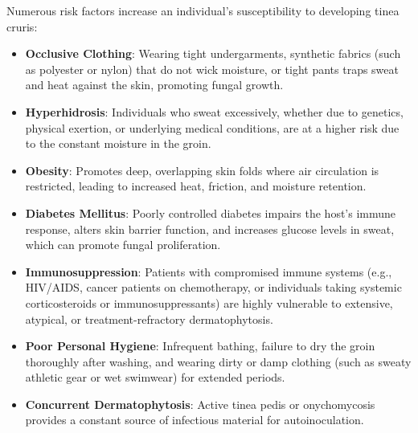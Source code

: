 Numerous risk factors increase an individual's susceptibility to developing tinea cruris:
\begin{itemize}
    \item \textbf{Occlusive Clothing}: Wearing tight undergarments, synthetic fabrics (such as polyester or nylon) that do not wick moisture, or tight pants traps sweat and heat against the skin, promoting fungal growth.
    \item \textbf{Hyperhidrosis}: Individuals who sweat excessively, whether due to genetics, physical exertion, or underlying medical conditions, are at a higher risk due to the constant moisture in the groin.
    \item \textbf{Obesity}: Promotes deep, overlapping skin folds where air circulation is restricted, leading to increased heat, friction, and moisture retention.
    \item \textbf{Diabetes Mellitus}: Poorly controlled diabetes impairs the host's immune response, alters skin barrier function, and increases glucose levels in sweat, which can promote fungal proliferation.
    \item \textbf{Immunosuppression}: Patients with compromised immune systems (e.g., HIV/AIDS, cancer patients on chemotherapy, or individuals taking systemic corticosteroids or immunosuppressants) are highly vulnerable to extensive, atypical, or treatment-refractory dermatophytosis.
    \item \textbf{Poor Personal Hygiene}: Infrequent bathing, failure to dry the groin thoroughly after washing, and wearing dirty or damp clothing (such as sweaty athletic gear or wet swimwear) for extended periods.
    \item \textbf{Concurrent Dermatophytosis}: Active tinea pedis or onychomycosis provides a constant source of infectious material for autoinoculation.
\end{itemize}

